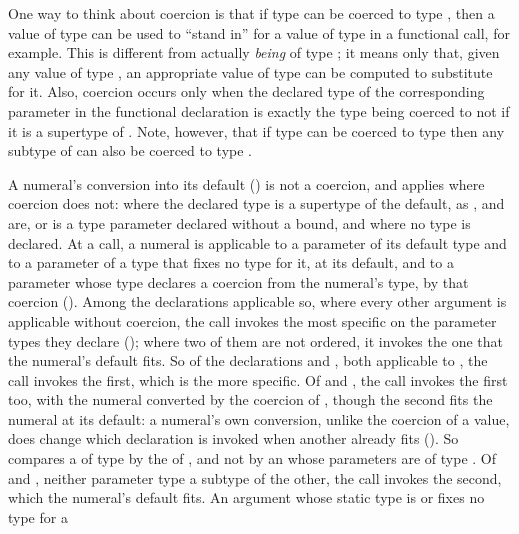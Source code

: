 One way to think about coercion is that if type  can be coerced
to type , then a value of type  can be used to ``stand
in'' for a value of type  in a functional call, for example.  This is
different from actually \emph{being} of type ; it means only
that, given any value of type , an appropriate value of type
 can be computed to substitute for it.  Also, coercion occurs
only when the declared type of the corresponding parameter in the
functional declaration is exactly the type  being coerced to
 not if it is a supertype of .  Note, however, that if type
  can be coerced to type  then any subtype of 
 can also be coerced to type .

A numeral's conversion into its default () is not a coercion,
and applies where coercion does not: where the declared type is a supertype of
the default, as ,  and  are, or is a type
parameter declared without a bound, and where no type is declared.
At a call, a numeral is applicable to a parameter of its default type and to a
parameter of a type that fixes no type for it, at its default, and to a
parameter whose type declares a coercion from the numeral's type, by that
coercion ().
Among the declarations applicable so, where every other argument is applicable
without coercion, the call invokes the most specific on the parameter types
they declare (); where two of them are not
ordered, it invokes the one that the numeral's default fits.
So of the declarations  and
, both applicable to , the
call invokes the first, which is the more specific.
Of  and , the call
 invokes the first too, with the numeral converted by the coercion of
, though the second fits the numeral at its default: a
numeral's own conversion, unlike the coercion of a value, does change which
declaration is invoked when another already fits ().
So  compares a  of type  by the \EXP{=} of
, and not by an \EXP{=} whose parameters are of type
.
Of  and , neither
parameter type a subtype of the other, the call  invokes the
second, which the numeral's default fits.
An argument whose static type is  or  fixes no type for a
